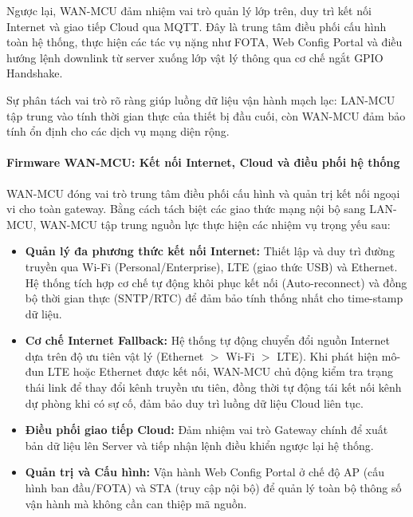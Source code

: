         Ngược lại, WAN-MCU đảm nhiệm vai trò quản lý lớp trên, duy trì kết nối Internet và giao tiếp Cloud qua MQTT. Đây là trung tâm điều phối cấu hình toàn hệ thống, thực hiện các tác vụ nặng như FOTA, Web Config Portal và điều hướng lệnh downlink từ server xuống lớp vật lý thông qua cơ chế ngắt GPIO Handshake.
        
        Sự phân tách vai trò rõ ràng giúp luồng dữ liệu vận hành mạch lạc: LAN-MCU tập trung vào tính thời gian thực của thiết bị đầu cuối, còn WAN-MCU đảm bảo tính ổn định cho các dịch vụ mạng diện rộng.

        
        \paragraph{Firmware WAN-MCU: Kết nối Internet, Cloud và điều phối hệ thống}
        
        WAN-MCU đóng vai trò trung tâm điều phối cấu hình và quản trị kết nối ngoại vi cho toàn gateway. Bằng cách tách biệt các giao thức mạng nội bộ sang LAN-MCU, WAN-MCU tập trung nguồn lực thực hiện các nhiệm vụ trọng yếu sau:

        \begin{itemize}
            \item \textbf{Quản lý đa phương thức kết nối Internet:} Thiết lập và duy trì đường truyền qua Wi-Fi (Personal/Enterprise), LTE (giao thức USB) và Ethernet. Hệ thống tích hợp cơ chế tự động khôi phục kết nối (Auto-reconnect) và đồng bộ thời gian thực (SNTP/RTC) để đảm bảo tính thống nhất cho time-stamp dữ liệu.
        
            \item \textbf{Cơ chế Internet Fallback:} Hệ thống tự động chuyển đổi nguồn Internet dựa trên độ ưu tiên vật lý (Ethernet $>$ Wi-Fi $>$ LTE). Khi phát hiện mô-đun LTE hoặc Ethernet được kết nối, WAN-MCU chủ động kiểm tra trạng thái link để thay đổi kênh truyền ưu tiên, đồng thời tự động tái kết nối kênh dự phòng khi có sự cố, đảm bảo duy trì luồng dữ liệu Cloud liên tục.
        
            \item \textbf{Điều phối giao tiếp Cloud:} Đảm nhiệm vai trò Gateway chính để xuất bản dữ liệu lên Server và tiếp nhận lệnh điều khiển ngược lại hệ thống.
        
            \item \textbf{Quản trị và Cấu hình:} Vận hành Web Config Portal ở chế độ AP (cấu hình ban đầu/FOTA) và STA (truy cập nội bộ) để quản lý toàn bộ thông số vận hành mà không cần can thiệp mã nguồn.
        \end{itemize}
        
